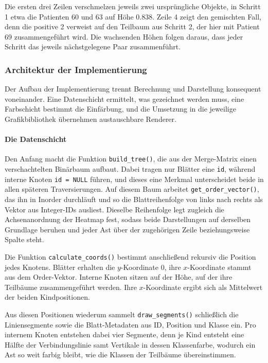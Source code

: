 \documentclass[12pt]{article}
\newcommand{\code}[1]{\texttt{#1}}
\begin{document}
Die ersten drei Zeilen verschmelzen jeweils zwei ursprüngliche Objekte, in 
Schritt 1 etwa die Patienten 60 und 63 auf Höhe 0.838. Zeile 4 zeigt den 
gemischten Fall, denn die positive 2 verweist auf den Teilbaum aus Schritt 2, 
der hier mit Patient 69 zusammengeführt wird. Die wachsenden Höhen folgen daraus, 
dass jeder Schritt das jeweils nächstgelegene Paar zusammenführt.

\subsubsection{Architektur der Implementierung}

Der Aufbau der Implementierung trennt Berechnung und Darstellung konsequent 
voneinander. Eine Datenschicht ermittelt, was gezeichnet werden muss, eine 
Farbschicht bestimmt die Einfärbung, und die Umsetzung in die jeweilige 
Grafikbibliothek übernehmen austauschbare Renderer.

\paragraph{Die Datenschicht}

Den Anfang macht die Funktion \code{build\_tree()}, die aus der Merge-Matrix einen 
verschachtelten Binärbaum aufbaut. Dabei tragen nur Blätter eine \code{id}, 
während interne Knoten \code{id = NULL} führen, und dieses eine Merkmal 
unterscheidet beide in allen späteren Traversierungen. Auf diesem Baum arbeitet 
\code{get\_order\_vector()}, das ihn in Inorder durchläuft und so die 
Blattreihenfolge von links nach rechts als Vektor aus Integer-IDs ausliest. 
Dieselbe Reihenfolge legt zugleich die Achsenanordnung der Heatmap fest, sodass 
beide Darstellungen auf derselben Grundlage beruhen und jeder Ast über der 
zugehörigen Zeile beziehungsweise Spalte steht. 

Die Funktion \code{calculate\_coords()} bestimmt anschließend rekursiv die 
Position jedes Knotens. Blätter erhalten die $y$-Koordinate $0$, ihre 
$x$-Koordinate stammt aus dem Order-Vektor. Interne Knoten sitzen auf der Höhe, 
auf der ihre Teilbäume zusammengeführt werden.  Ihre $x$-Koordinate ergibt 
sich als Mittelwert der beiden Kindpositionen.

Aus diesen Positionen wiederum sammelt \code{draw\_segments()} schließlich die 
Liniensegmente sowie die Blatt-Metadaten aus ID, Position und Klasse ein. Pro 
internem Knoten entstehen dabei vier Segmente, denn je Kind entsteht eine Hälfte 
der Verbindungslinie samt Vertikale in dessen Klassenfarbe, wodurch ein Ast so 
weit farbig bleibt, wie die Klassen der Teilbäume übereinstimmen.
\end{document}
